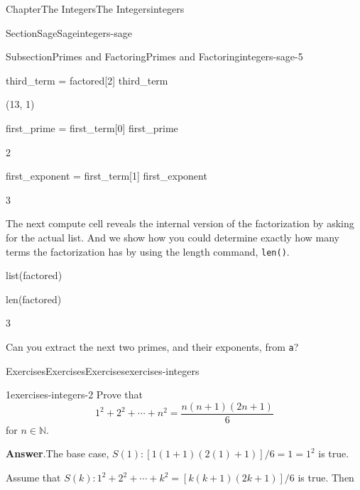 \documentclass[oneside,10pt,]{book}
\newcommand{\blocktitlefont}{\relax}
\newcommand{\mono}[1]{\texttt{#1}}
\numberwithin{equation}{section}
\begin{document}
\begin{chapterptx}{Chapter}{The Integers}{}{The Integers}{}{}{integers}
\begin{sectionptx}{Section}{Sage}{}{Sage}{}{}{integers-sage}
\begin{subsectionptx}{Subsection}{Primes and Factoring}{}{Primes and Factoring}{}{}{integers-sage-5}
\begin{sageinput}
third_term = factored[2]
third_term
\end{sageinput}
\begin{sageoutput}
(13, 1)
\end{sageoutput}
\begin{sageinput}
first_prime = first_term[0]
first_prime
\end{sageinput}
\begin{sageoutput}
2
\end{sageoutput}
\begin{sageinput}
first_exponent = first_term[1]
first_exponent
\end{sageinput}
\begin{sageoutput}
3
\end{sageoutput}
The next compute cell reveals the internal version of the factorization by asking for the actual list.  And we show how you could determine exactly how many terms the factorization has by using the length command, \mono{len()}.%
\begin{sageinput}
list(factored)
\end{sageinput}
\begin{sageoutput}
[(2, 3), (5, 2), (13, 1)]
\end{sageoutput}
\begin{sageinput}
len(factored)
\end{sageinput}
\begin{sageoutput}
3
\end{sageoutput}
Can you extract the next two primes, and their exponents, from \mono{a}?%
\end{subsectionptx}
\end{sectionptx}
%
%
\typeout{************************************************}
\typeout{************************************************}
%
\begin{exercises-section}{Exercises}{Exercises}{}{Exercises}{}{}{exercises-integers}
\begin{divisionexercise}{1}{}{}{exercises-integers-2}%
Prove that%
\begin{equation*}
1^2 + 2^2 + \cdots + n^2 = \frac{n(n + 1)(2n + 1)}{6}
\end{equation*}
for \(n \in {\mathbb N}\).%
\par\smallskip%
\noindent\textbf{\blocktitlefont Answer}.\hypertarget{exercises-integers-2-2}{}\quad{}The base case, \(S(1): [1(1 + 1)(2(1) + 1)]/6 = 1 = 1^2\) is true.%
\par
Assume that \(S(k): 1^2 + 2^2 + \cdots + k^2 = [k(k + 1)(2k + 1)]/6\) is true. Then%

\end{divisionexercise}
\end{exercises-section}
\end{chapterptx}
\end{document}
